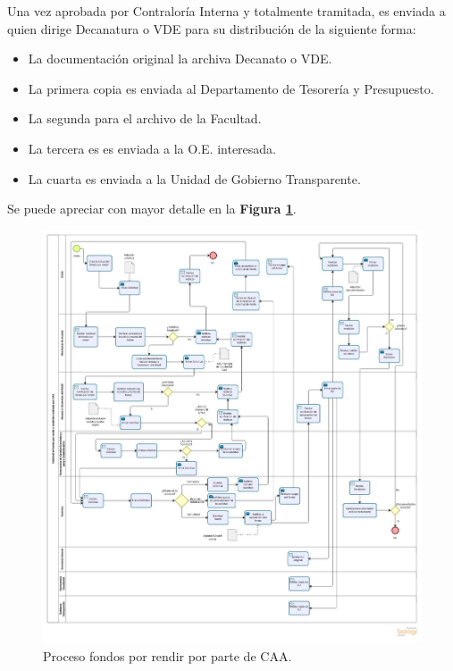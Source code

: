 \begin{tasks}[counter-format = {tsk[A].}]
	Una vez aprobada por Contraloría Interna y totalmente tramitada, es enviada a quien dirige Decanatura o VDE para su distribución de la siguiente forma: 
	\begin{itemize}
		\item La documentación original la archiva Decanato o VDE.
		\item La primera copia es enviada al Departamento de Tesorería y Presupuesto.
		\item La segunda para el archivo de la Facultad.
		\item La tercera es es enviada a la O.E. interesada.
		\item La cuarta es enviada a la Unidad de Gobierno Transparente.

	\end{itemize}

	Se puede apreciar con mayor detalle en la \textbf{Figura \ref{fig: Solicitud_CAA}}.

\end{tasks}

\begin{figure}[p!]
	\includegraphics[width=\textwidth]{Imagenes/Solicitud_CCAA.jpg}
	\caption{\label{fig: Solicitud_CAA}Proceso fondos por rendir por parte de CAA.}
\end{figure}

